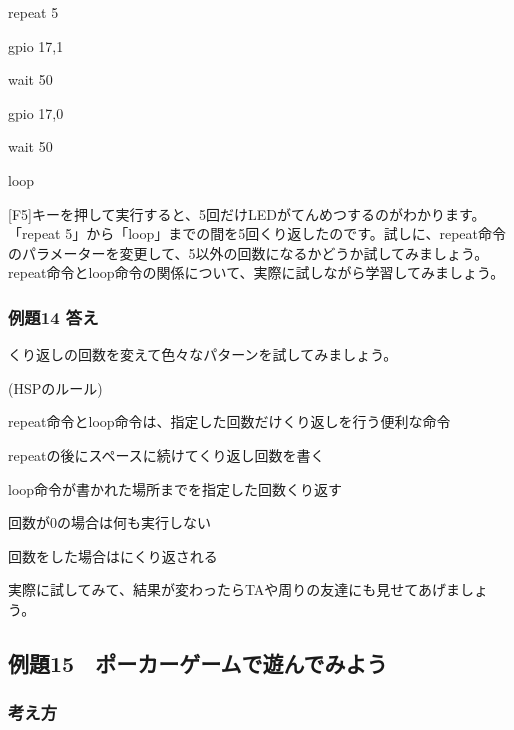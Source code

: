 \documentclass[text02.tex]{subfiles}
\begin{document}
\begin{description}
    \item repeat 5
    \item gpio 17,1
    \item wait 50
    \item gpio 17,0
    \item wait 50
    \item loop
\end{description}

[F5]キーを押して実行すると、5回だけLEDがてんめつするのがわかります。
「repeat
5」から「loop」までの間を5回くり返したのです。試しに、repeat命令のパラメーターを変更して、5以外の回数になるかどうか試してみましょう。
repeat命令とloop命令の関係について、実際に試しながら学習してみましょう。

\subsubsection*{例題14 答え}

くり返しの回数を変えて色々なパターンを試してみましょう。

\begin{description}
    \item (HSPのルール)
\end{description}

\begin{description}
    \item repeat命令とloop命令は、指定した回数だけくり返しを行う便利な命令
    \item repeatの後にスペースに続けてくり返し回数を書く
    \item loop命令が書かれた場所までを指定した回数くり返す
    \item 回数が0の場合は何も実行しない
    \item 回数をした場合はにくり返される
\end{description}

実際に試してみて、結果が変わったらTAや周りの友達にも見せてあげましょう。

\clearpage
\subsection{例題15　ポーカーゲームで遊んでみよう}

\subsubsection*{考え方}
\end{document}
